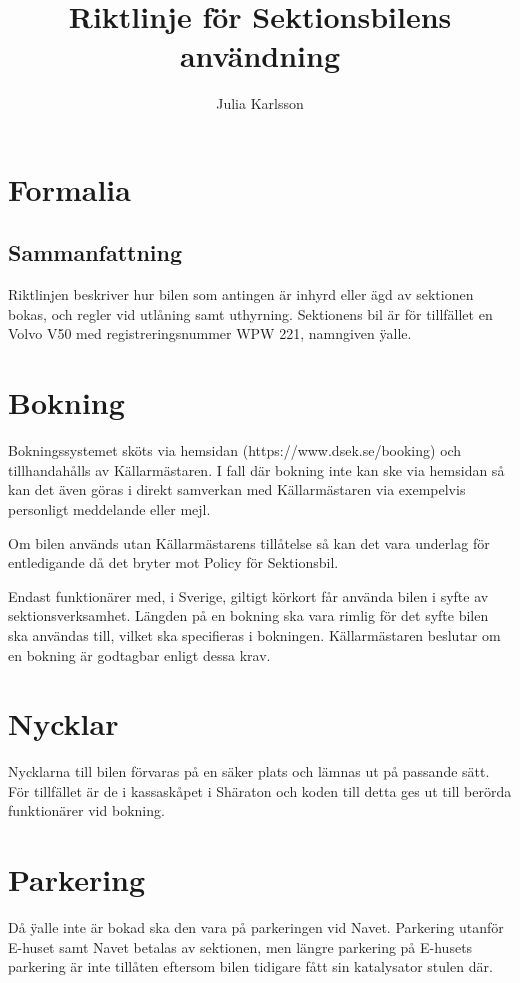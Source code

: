 \documentclass{dsekprotokoll}
\author{Julia Karlsson}
\title{Riktlinje för Sektionsbilens användning}
\begin{document}
\maketitle
\section{Formalia}
\subsection{Sammanfattning}
Riktlinjen beskriver hur bilen som antingen är inhyrd eller ägd av sektionen bokas, och regler vid utlåning samt uthyrning. Sektionens bil är för tillfället en Volvo V50 med registreringsnummer WPW 221, namngiven \"yalle.

\section{Bokning}
Bokningssystemet sköts via hemsidan (https://www.dsek.se/booking) och tillhandahålls av Källarmästaren. I fall där bokning inte kan ske via hemsidan så kan det även göras i direkt samverkan med Källarmästaren via exempelvis personligt meddelande eller mejl. 

Om bilen används utan Källarmästarens tillåtelse så kan det vara underlag för entledigande då det bryter mot Policy för Sektionsbil. 

Endast funktionärer med, i Sverige, giltigt körkort får använda bilen i syfte av sektionsverksamhet. Längden på en bokning ska vara rimlig för det syfte bilen ska användas till, vilket ska specifieras i bokningen. Källarmästaren beslutar om en bokning är godtagbar enligt dessa krav.

\section{Nycklar}
Nycklarna till bilen förvaras på en säker plats och lämnas ut på passande sätt. För tillfället är de i kassaskåpet i Shäraton och koden till detta ges ut till berörda funktionärer vid bokning.

\section{Parkering}

Då \"yalle inte är bokad ska den vara på parkeringen vid Navet. Parkering utanför E-huset samt Navet betalas av sektionen, men längre parkering på E-husets parkering är inte tillåten eftersom bilen tidigare fått sin katalysator stulen där. 
\end{document}
